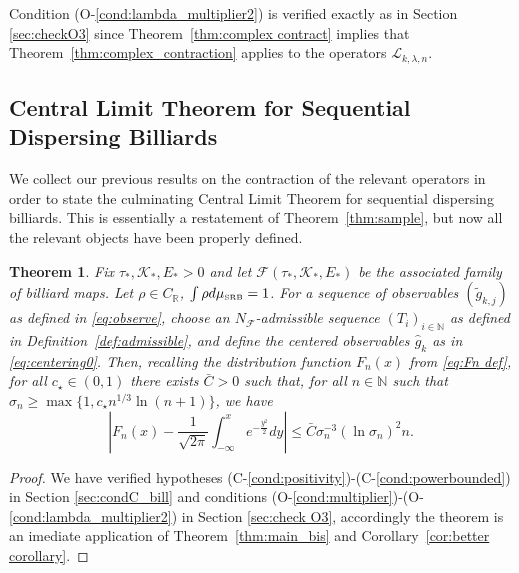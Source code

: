 \documentclass{amsart}
\numberwithin{equation}{section}
\newtheorem{thm}{Theorem}[section]
\newcommand\cF{{\mathcal F}}
\newcommand\cK{{\mathcal K}}
\newcommand\cL{{\mathcal L}}
\newcommand\bR{{\mathbb R}}
\newcommand{\musrb}{\mu_{\mbox{\tiny SRB}}}
\begin{document}
Condition (O-\ref{cond:lambda_multiplier2}) is verified exactly as in Section \ref{sec:checkO3}
 since Theorem~\ref{thm:complex contract} implies that Theorem~\ref{thm:complex_contraction} applies to the 
operators $\cL_{k,\lambda,n}$.



\subsection{Central Limit Theorem for Sequential Dispersing Billiards}
\label{sec:CLT billiard}

We collect our previous results on the contraction of the relevant operators in order to state the culminating
Central Limit Theorem for sequential dispersing billiards.  This is essentially a restatement of 
Theorem~\ref{thm:sample}, but now all the relevant objects have been properly defined.  

\begin{thm}
\label{thm:billiard CLT}
Fix $\tau_*, \cK_*, E_*>0$ and let $\cF(\tau_*, \cK_*, E_*)$ be the associated family of billiard maps.  Let
$\rho \in C_{\bR}$, $\int \rho d\musrb=1$.
For a sequence of observables $(\tilde g_{k,j})$ as defined in \eqref{eq:observe}, choose an $N_\cF$-admissible sequence
$(T_i)_{i \in \mathbb{N}}$ as defined in Definition~\ref{def:admissible}, and define the centered observables 
$\hat{g}_k$ as in \eqref{eq:centering0}.  Then, recalling the distribution function $F_n(x)$ from \eqref{eq:Fn def},
for all $c_\star \in (0,1)$  there
exists $\bar C>0$ such that, for all $n \in \mathbb{N}$ such that $\sigma_n \ge \max \{ 1, c_\star n^{1/3} \ln(n+1) \}$, we have
\[
\left|F_n(x)-\frac{1}{\sqrt{2\pi}}\int_{-\infty}^xe^{-\frac {y^2}2}dy\right|\leq \bar C \sigma_n^{-3}(\ln \sigma_n)^2 n.
\]
\end{thm}

\begin{proof}
We have verified hypotheses (C-\ref{cond:positivity})-(C-\ref{cond:powerbounded}) in Section \ref{sec:condC_bill} and 
conditions (O-\ref{cond:multiplier})-(O-\ref{cond:lambda_multiplier2}) in Section \ref{sec:check O3}, accordingly
the theorem is an imediate application of Theorem~\ref{thm:main_bis} and Corollary~\ref{cor:better corollary}.
\end{proof}
\end{document}
